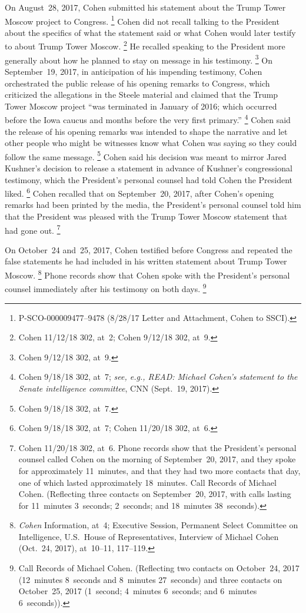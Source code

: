 On August~28, 2017, Cohen submitted his statement about the Trump Tower Moscow project to Congress.%
\footnote{P-SCO-000009477--9478 (8/28/17 Letter and Attachment, Cohen to SSCI).}
Cohen did not recall talking to the President about the specifics of what the statement said or what Cohen would later testify to about Trump Tower Moscow.%
\footnote{Cohen 11/12/18 302, at~2;
Cohen 9/12/18 302, at~9.}
He recalled speaking to the President more generally about how he planned to stay on message in his testimony.%
\footnote{Cohen 9/12/18 302, at~9.}
On September~19, 2017, in anticipation of his impending testimony, Cohen orchestrated the public release of his opening remarks to Congress, which criticized the allegations in the Steele material and claimed that the Trump Tower Moscow project ``was terminated in January of 2016; which occurred before the Iowa caucus and months before the very first primary.''%
\footnote{Cohen 9/18/18 302, at~7;
\textit{see, e.g., READ: Michael Cohen's statement to the Senate intelligence committee}, CNN (Sept.~19, 2017).}
Cohen said the release of his opening remarks was intended to shape the narrative and let other people who might be witnesses know what Cohen was saying so they could follow the same message.%
\footnote{Cohen 9/18/18 302, at~7.}
Cohen said his decision was meant to mirror Jared Kushner's decision to release a statement in advance of Kushner's congressional testimony, which the President's personal counsel had told Cohen the President liked.%
\footnote{Cohen 9/18/18 302, at~7;
Cohen 11/20/18 302, at~6.}
Cohen recalled that on September~20, 2017, after Cohen's opening remarks had been printed by the media, the President's personal counsel told him that the President was pleased with the Trump Tower Moscow statement that had gone out.%
\footnote{Cohen 11/20/18 302, at~6.
Phone records show that the President's personal counsel called Cohen on the morning of September~20, 2017, and they spoke for approximately 11~minutes, and that they had two more contacts that day, one of which lasted approximately 18~minutes.
Call Records of Michael Cohen. (Reflecting three contacts on September~20, 2017, with calls lasting for 11~minutes 3~seconds; 2~seconds; and 18~minutes 38~seconds).}

On October~24 and~25, 2017, Cohen testified before Congress and repeated the false statements he had included in his written statement about Trump Tower Moscow.%
\footnote{\textit{Cohen} Information, at~4;
Executive Session, Permanent Select Committee on Intelligence, U.S.~House of Representatives, Interview of Michael Cohen (Oct.~24, 2017), at~10--11, 117--119.}
Phone records show that Cohen spoke with the President's personal counsel immediately after his testimony on both days.%
\footnote{Call Records of Michael Cohen.
(Reflecting two contacts on October~24, 2017 (12~minutes 8~seconds and 8~minutes 27~seconds) and three contacts on October~25, 2017 (1~second; 4~minutes 6~seconds; and 6~minutes 6~seconds)).}

